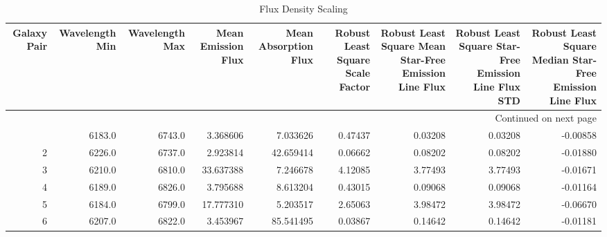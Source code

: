 \begin{longtable}{rrrrrrrrr}
\caption{Flux Density Scaling}\\
\toprule
 Galaxy Pair &  Wavelength Min &  Wavelength Max &  Mean Emission Flux &  Mean Absorption Flux &  Robust Least Square Scale Factor &  Robust Least Square Mean Star-Free Emission Line Flux &  Robust Least Square Star-Free Emission Line Flux STD &  Robust Least Square Median Star-Free Emission Line Flux \\
\midrule
\endhead
\midrule
\multicolumn{9}{r}{{Continued on next page}} \\
\midrule
\endfoot

\bottomrule
\endlastfoot
           1 &          6183.0 &          6743.0 &            3.368606 &              7.033626 &                           0.47437 &                                            0.03208 &                                            0.03208 &                                           -0.00858 \\
           2 &          6226.0 &          6737.0 &            2.923814 &             42.659414 &                           0.06662 &                                            0.08202 &                                            0.08202 &                                           -0.01880 \\
           3 &          6210.0 &          6810.0 &           33.637388 &              7.246678 &                           4.12085 &                                            3.77493 &                                            3.77493 &                                           -0.01671 \\
           4 &          6189.0 &          6826.0 &            3.795688 &              8.613204 &                           0.43015 &                                            0.09068 &                                            0.09068 &                                           -0.01164 \\
           5 &          6184.0 &          6799.0 &           17.777310 &              5.203517 &                           2.65063 &                                            3.98472 &                                            3.98472 &                                           -0.06670 \\
           6 &          6207.0 &          6822.0 &            3.453967 &             85.541495 &                           0.03867 &                                            0.14642 &                                            0.14642 &                                           -0.01181 \\

\end{longtable}

